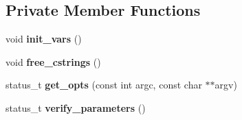 \subsection*{Private Member Functions}
\begin{CompactItemize}
\item 
void \textbf{init\_\-vars} ()\label{classASCbase_1_1SearchParameters_0b3092dc843090100b6d8707f438ff82}

\item 
void \textbf{free\_\-cstrings} ()\label{classASCbase_1_1SearchParameters_c5be044fd7c950fbf1b3472d01e9c0f5}

\item 
status\_\-t \textbf{get\_\-opts} (const int argc, const char $\ast$$\ast$argv)\label{classASCbase_1_1SearchParameters_e7af633b8fc93087ddf5067551929741}

\item 
status\_\-t \textbf{verify\_\-parameters} ()\label{classASCbase_1_1SearchParameters_cc0d8f138dd11fa98a0fa52c59f1a9b2}

\end{CompactItemize}
